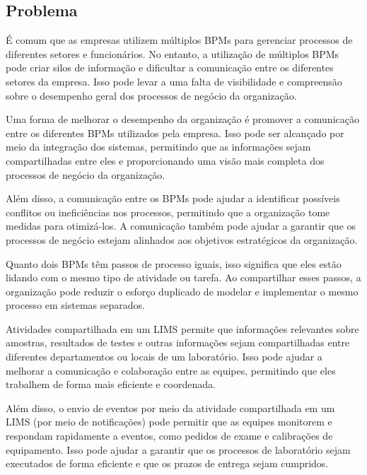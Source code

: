 \subsection{Problema}

É comum que as empresas utilizem múltiplos BPMs para gerenciar processos de diferentes setores e funcionários.
No entanto, a utilização de múltiplos BPMs pode criar silos de informação e dificultar a comunicação entre os diferentes setores da empresa. Isso pode levar a uma falta de visibilidade e compreensão sobre o desempenho geral dos processos de negócio da organização.

Uma forma de melhorar o desempenho da organização é promover a comunicação entre os diferentes BPMs utilizados pela empresa. Isso pode ser alcançado por meio da integração dos sistemas, permitindo que as informações sejam compartilhadas entre eles e proporcionando uma visão mais completa dos processos de negócio da organização.

Além disso, a comunicação entre os BPMs pode ajudar a identificar possíveis conflitos ou ineficiências nos processos, permitindo que a organização tome medidas para otimizá-los. A comunicação também pode ajudar a garantir que os processos de negócio estejam alinhados aos objetivos estratégicos da organização.

Quanto dois BPMs têm passos de processo iguais, isso significa que eles estão lidando com o mesmo tipo de atividade ou tarefa. Ao compartilhar esses passos, a organização pode reduzir o esforço duplicado de modelar e implementar o mesmo processo em sistemas separados.

Atividades compartilhada em um LIMS permite que informações relevantes sobre amostras, resultados de testes e outras informações sejam compartilhadas entre diferentes departamentos ou locais de um laboratório. Isso pode ajudar a melhorar a comunicação e colaboração entre as equipes, permitindo que eles trabalhem de forma mais eficiente e coordenada.

Além disso, o envio de eventos por meio da atividade compartilhada em um LIMS (por meio de notificações) pode permitir que as equipes monitorem e respondam rapidamente a eventos, como pedidos de exame e calibrações de equipamento. Isso pode ajudar a garantir que os processos de laboratório sejam executados de forma eficiente e que os prazos de entrega sejam cumpridos.